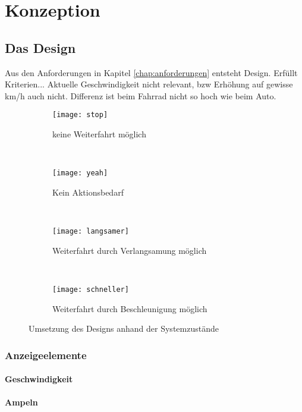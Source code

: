 \chapter{\label{chap:entwurf}Konzeption}
\section{Das Design}
Aus den Anforderungen in Kapitel \ref{chap:anforderungen} entsteht Design. Erfüllt Kriterien... Aktuelle Geschwindigkeit nicht relevant, bzw Erhöhung auf gewisse km/h auch nicht. Differenz ist beim Fahrrad nicht so hoch wie beim Auto.
\begin{figure}[H]
        \centering
           \begin{subfigure}[t]{0.23\textwidth}
                \texttt{[image: stop]}
                \caption[Systemzustand d]{keine Weiterfahrt möglich}
                \label{fig:stop}
        \end{subfigure}
           ~ 
              \begin{subfigure}[t]{0.23\textwidth}
                \texttt{[image: yeah]}
                \caption[Systemzustand c]{Kein Aktionsbedarf}
                \label{fig:yeah}
        \end{subfigure}
           ~
        \begin{subfigure}[t]{0.23\textwidth}
                \texttt{[image: langsamer]}
                \caption[Systemzustand a]{Weiterfahrt durch Verlangsamung  möglich}
                \label{fig:langsamer}
        \end{subfigure}
        ~
        \begin{subfigure}[t]{0.23\textwidth}
                \texttt{[image: schneller]}
                \caption[Systemzustand b]{Weiterfahrt durch Beschleunigung möglich}
                \label{fig:schneller}
        \end{subfigure}     
        \caption[Systemzustände im Ampelbereich]{Umsetzung des Designs anhand der Systemzustände}
        \label{fig:mockup}
\end{figure} 
\subsection{Anzeigeelemente}
\subsubsection{Geschwindigkeit}
\subsubsection{Ampeln}
